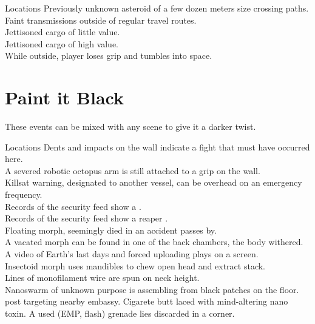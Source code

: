 \documentclass[a4]{book}
\begin{document}
\begin{tableone}{Locations}
Previously unknown asteroid of a few dozen meters size crossing paths.\\
Faint transmissions outside of regular travel routes.\\
Jettisoned cargo of little value.\\
Jettisoned cargo of high value.\\
While outside, player loses grip and tumbles into space.\\
\end{tableone}



\section*{Paint it Black}

These events can be mixed with any scene to give it a darker twist.

\begin{tableone}{Locations}
Dents and impacts on the wall indicate a fight that must have occurred here.\\
A severed robotic octopus arm is still attached to a grip on the wall.\\
Killsat warning, designated to another vessel, can be overhead on an emergency frequency.\\
Records of the security feed show a  .\\
Records of the security feed show a reaper .\\
Floating morph, seemingly died in an accident passes by.\\
A vacated morph can be found in one of the back chambers, the body withered.\\
A video of Earth's last days and forced uploading plays on a screen.\\
Insectoid morph uses mandibles to chew open head and extract stack.\\
Lines of monofilament wire are spun on neck height.\\
Nanoswarm of unknown purpose is assembling from black patches on the floor.\\
 post targeting nearby embassy.
Cigarete butt laced with mind-altering nano toxin.
A used (EMP, flash) grenade lies discarded in a corner.\\
\end{tableone}
\end{document}
